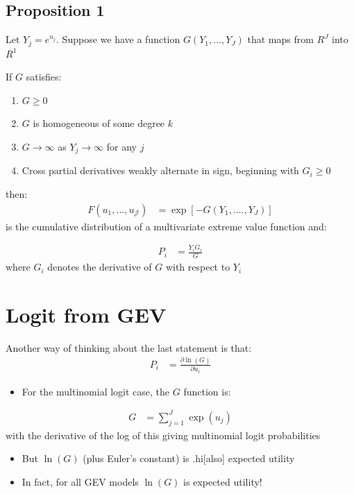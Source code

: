 \documentclass[11pt]{article}
\begin{document}
\subsection{Proposition 1 \cite{mcfadden1978}}
\label{sec:org1f39404}
Let \(Y_{j}=e^{u_{j}}\). Suppose we have a function \(G(Y_{1},...,Y_{{J}})\) that maps from \(R^{{J}}\) into \(R^1\)

If \(G\) satisfies:
\begin{enumerate}
\item \(G\geq 0\)
\item \(G\) is homogeneous of some degree \(k\)
\item \(G\rightarrow \infty\) as \(Y_{j}\rightarrow \infty\) for any \(j\)
\item Cross partial derivatives weakly alternate in sign, beginning with \(G_{i}\geq 0\)
\end{enumerate}


then:
\begin{align*}
F(u_1,...,u_\mathcal{J})&=\exp\left[-G(Y_1,....,Y_{J})\right]
\end{align*}
is the cumulative distribution of a multivariate extreme value function and:

\begin{align*}
P_{i}&=\frac{Y_{i}G_{i}}{G}
\end{align*}
where \(G_i\) denotes the derivative of \(G\) with respect to \(Y_i\)

\section{Logit from GEV}
\label{sec:orgdf323d0}

Another way of thinking about the last statement is that:
\begin{align*}
P_i&=\frac{\partial \ln(G)}{\partial u_i}
\end{align*}

\begin{itemize}
\item For the multinomial logit case, the \(G\) function is:
\end{itemize}
\begin{align*}
G&=\sum_{j=1}^{{J}}\exp(u_j)
\end{align*}
with the derivative of the log of this giving multinomial logit probabilities

\begin{itemize}
\item But \(\ln(G)\) (plus Euler's constant) is .hi[also] expected utility

\item In fact, for all GEV models \(\ln(G)\) is expected utility!
\end{itemize}
\end{document}
